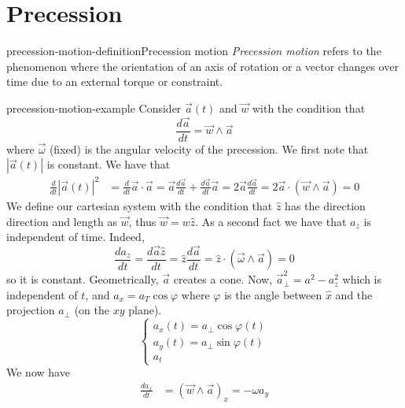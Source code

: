 \documentclass[preview]{standalone}
\begin{document}
\genpage

\section{Precession}

\begin{snippetdefinition}{precession-motion-definition}{Precession motion}
    \emph{Precession motion} refers to the phenomenon where the orientation of an axis of
    rotation or a vector changes over time due to an external torque or constraint.
\end{snippetdefinition}

\begin{snippetexample}{precession-motion-example}{}
    Consider \(\vec{a}(t)\) and \(\vec{w}\) with the condition that
    \[
        \frac{d\vec{a}}{dt} = \vec{w} \wedge \vec{a}
    \]
    where \(\vec{\omega}\) (fixed) is the angular velocity of the precession.
    We first note that \(|\vec{a}(t)|\) is constant.
    We have that
    \begin{align*}
        \frac{d}{dt} {|\vec{a}(t)|}^2 &= \frac{d}{dt} \vec{a}\cdot\vec{a}
        = \vec{a}\frac{d\vec{a}}{dt} + \frac{d\vec{a}}{dt} \vec{a} 
        = 2\vec{a}\frac{d\vec{a}}{dt}
        = 2 \vec{a} \cdot (\vec{w} \wedge \vec{a})
        = 0
    \end{align*}
    We define our cartesian system with the condition that \(\hat{z}\) has the direction
    direction and length as \(\vec{w}\), thus \(\vec{w} = w\hat{z}\).
    As a second fact we have that \(a_z\) is independent of time.
    Indeed,
    \[
        \frac{da_z}{dt} = \frac{d\vec{a}\hat{z}}{dt} =  \hat{z}\frac{d\vec{a}}{dt}
        = \hat{z} \cdot (\vec{\omega} \wedge \vec{a})
        = 0
    \]
    so it is constant. Geometrically, \(\vec{a}\) creates a cone.
    Now, \(\vec{a}_\perp^2 = a^2 - a_z^2\) which is independent of \(t\),
    and \(a_x = a_T \cos\varphi\) where \(\varphi\) is the angle between \(\hat{x}\)
    and the projection \(a_\perp\) (on the \(xy\) plane).
    \[
        \begin{cases}
            a_x(t) = a_\perp \cos\varphi(t) \\
            a_y(t) = a_\perp \sin\varphi(t) \\
            a_t
        \end{cases}
    \]
    We now have
    \begin{align*}
        \frac{da_x}{dt} &= {(\vec{w} \wedge \vec{a})}_x
        = -\omega a_y \\

\end{align*}
\end{snippetexample}
\end{document}
